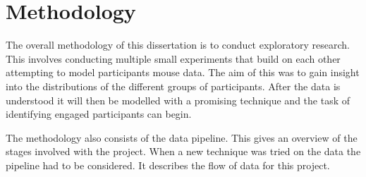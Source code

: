 \documentclass{article}
\begin{document}








\section{Methodology}

The overall methodology of this dissertation is to conduct exploratory research.
This involves conducting multiple small experiments that build on each other attempting to model participants mouse data.
The aim of this was to gain insight into the distributions of the different groups of participants.
After the data is understood it will then be modelled with a promising technique and the task of identifying engaged participants can begin. 

The methodology also consists of the data pipeline.
This gives an overview of the stages involved with the project.
When a new technique was tried on the data the pipeline had to be considered. 
It describes the flow of data for this project.

\end{document}
